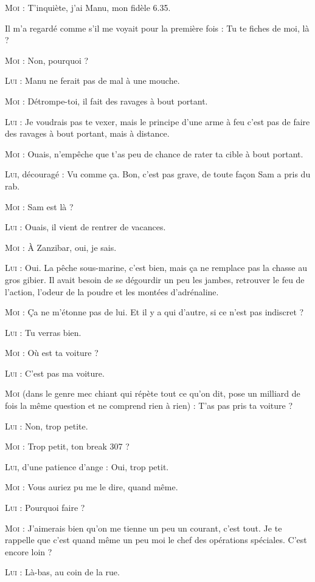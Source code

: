 \begin{dialogue}

\textsc{Moi} : T’inquiète, j’ai Manu, mon fidèle 6.35.

Il m’a regardé comme s’il me voyait pour la première fois : Tu te fiches de moi, là ?

\textsc{Moi} : Non, pourquoi ?

\textsc{Lui} : Manu ne ferait pas de mal à une mouche.

\textsc{Moi} : Détrompe-toi, il fait des ravages à bout portant.

\textsc{Lui} : Je voudrais pas te vexer, mais le principe d’une arme à feu c’est pas de faire des ravages à bout portant, mais à distance.

\textsc{Moi} : Ouais, n’empêche que t’as peu de chance de rater ta cible à bout portant.

\textsc{Lui}, découragé : Vu comme ça. Bon, c’est pas grave, de toute façon Sam a pris du rab.

\textsc{Moi} : Sam est là ?

\textsc{Lui} : Ouais, il vient de rentrer de vacances.

\textsc{Moi} : À Zanzibar, oui, je sais.

\textsc{Lui} : Oui. La pêche sous-marine, c’est bien, mais ça ne remplace pas la chasse au gros gibier. Il avait besoin de se dégourdir un peu les jambes, retrouver le feu de l’action, l’odeur de la poudre et les montées d’adrénaline.

\textsc{Moi} : Ça ne m’étonne pas de lui. Et il y a qui d’autre, si ce n’est pas indiscret ?

\textsc{Lui} : Tu verras bien.

\textsc{Moi} : Où est ta voiture ?

\textsc{Lui} : C’est pas ma voiture.

\textsc{Moi} (dans le genre mec chiant qui répète tout ce qu’on dit, pose un milliard de fois la même question et ne comprend rien à rien) : T’as pas pris ta voiture ?

\textsc{Lui} : Non, trop petite.

\textsc{Moi} : Trop petit, ton break 307 ? 

\illusloflabel{}%
%
%
\textsc{Lui}, d’une patience d’ange : Oui, trop petit.

\textsc{Moi} : Vous auriez pu me le dire, quand même.

\textsc{Lui} : Pourquoi faire ?

\textsc{Moi} : J’aimerais bien qu’on me tienne un peu un courant, c’est tout. Je te rappelle que c’est quand même un peu moi le chef des opérations spéciales. C’est encore loin ?

\textsc{Lui} : Là-bas, au coin de la rue.

\end{dialogue}

